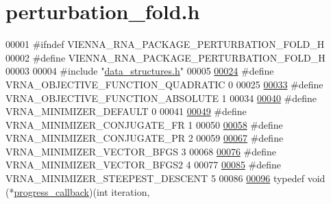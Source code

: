 \hypertarget{perturbation__fold_8h_source}{}\section{perturbation\+\_\+fold.\+h}
\label{perturbation__fold_8h_source}

\begin{DoxyCode}
00001 \textcolor{preprocessor}{#ifndef VIENNA\_RNA\_PACKAGE\_PERTURBATION\_FOLD\_H}
00002 \textcolor{preprocessor}{#define VIENNA\_RNA\_PACKAGE\_PERTURBATION\_FOLD\_H}
00003 
00004 \textcolor{preprocessor}{#include "\hyperlink{data__structures_8h}{data\_structures.h}"}
00005 
\hyperlink{group__perturbation_ga81e10993d1ae728e4e02022b33155a12}{00024} \textcolor{preprocessor}{#define VRNA\_OBJECTIVE\_FUNCTION\_QUADRATIC 0}
00025 
\hyperlink{group__perturbation_gac070dfb9cafaeb14d5652bd9adf0f6b1}{00033} \textcolor{preprocessor}{#define VRNA\_OBJECTIVE\_FUNCTION\_ABSOLUTE 1}
00034 
\hyperlink{group__perturbation_gae5126200d80dbb282f46083fffc606bf}{00040} \textcolor{preprocessor}{#define VRNA\_MINIMIZER\_DEFAULT 0}
00041 
\hyperlink{group__perturbation_gab1d89db58e8c497795a5005f5dbc8c4a}{00049} \textcolor{preprocessor}{#define VRNA\_MINIMIZER\_CONJUGATE\_FR 1}
00050 
\hyperlink{group__perturbation_ga5aaeafe1b0aa77a5cda18943ff94b02f}{00058} \textcolor{preprocessor}{#define VRNA\_MINIMIZER\_CONJUGATE\_PR 2}
00059 
\hyperlink{group__perturbation_ga9be8a702cddf58235571ace11cc41b22}{00067} \textcolor{preprocessor}{#define VRNA\_MINIMIZER\_VECTOR\_BFGS 3}
00068 
\hyperlink{group__perturbation_ga7b0a65c6c92fa1d8012383ba9d3dcb4f}{00076} \textcolor{preprocessor}{#define VRNA\_MINIMIZER\_VECTOR\_BFGS2 4}
00077 
\hyperlink{group__perturbation_ga9ecd2144c2ebed7533233da3986521b0}{00085} \textcolor{preprocessor}{#define VRNA\_MINIMIZER\_STEEPEST\_DESCENT 5}
00086 
\hyperlink{group__perturbation_gaa715397c7afd2d2955c315512a3d571a}{00096} \textcolor{keyword}{typedef} void (*\hyperlink{group__perturbation_gaa715397c7afd2d2955c315512a3d571a}{progress\_callback})(\textcolor{keywordtype}{int}     iteration,

\end{DoxyCode}
